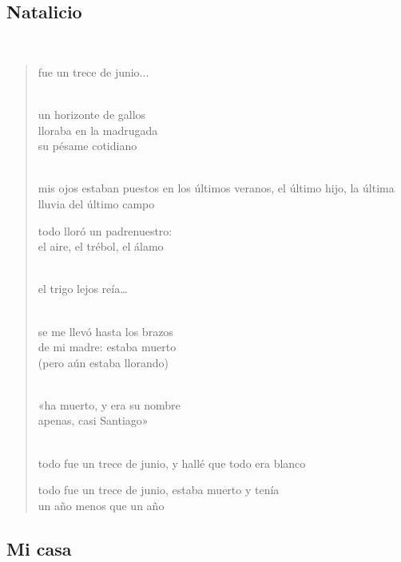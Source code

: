 \documentclass[a4paper, 12pt]{article}
\begin{document}
\pagebreak
\subsection{Natalicio}
~ 

\begin{verse}
    
fue un trece de junio...\\
~ 

un horizonte de gallos\\
lloraba en la madrugada\\
su pésame cotidiano\\
~ 

mis ojos estaban puestos
en los últimos veranos,
el último hijo, la última
lluvia del último campo
~

todo lloró un padrenuestro:\\
el aire, el trébol, el álamo\\
~ 

el trigo lejos reía…\\
~ 

se me llevó hasta los brazos\\
de mi madre: estaba muerto\\
(pero aún estaba llorando)\\
~ 

«ha muerto, y era su nombre\\
apenas, casi Santiago»\\
~ 

todo fue un trece de junio,
y hallé que todo era blanco 
~

todo fue un trece de junio,
estaba muerto y tenía\\
un año menos que un año\\
\end{verse}

\pagebreak 
\subsection{Mi casa}

\scriptsize
\begin{quote}

\end{quote}
\normalsize
\end{document}
